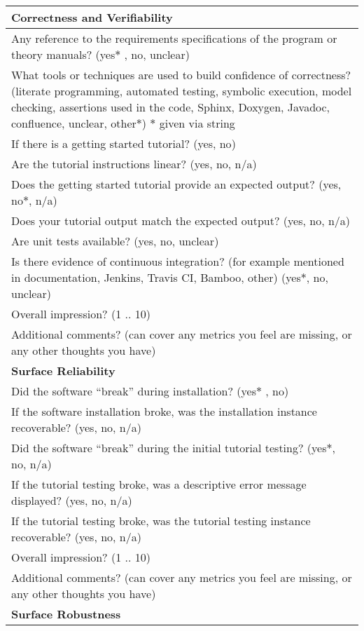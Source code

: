 \begin{table}[H]
\centering
\begin{tabular}{p{14cm}}
\hline
\textbf{Correctness and Verifiability}\\
\hline
Any reference to the requirements specifications of the program or theory manuals? ({yes$\ast$ , no, unclear})\\
What tools or techniques are used to build confidence of correctness? ({literate programming, automated testing, symbolic execution, model checking, assertions used in the code, Sphinx, Doxygen, Javadoc, confluence, unclear, other$\ast$}) $\ast$ given via string\\
If there is a getting started tutorial? ({yes, no})\\
Are the tutorial instructions linear? ({yes, no, n/a})\\
Does the getting started tutorial provide an expected output? ({yes, no$\ast$, n/a})\\
Does your tutorial output match the expected output? ({yes, no, n/a})\\
Are unit tests available?  ({yes, no, unclear})\\
Is there evidence of continuous integration? (for example mentioned in documentation, Jenkins, Travis CI, Bamboo, other) ({yes$\ast$, no, unclear})\\
Overall impression? ({1 .. 10})\\
Additional comments? (can cover any metrics you feel are missing, or any other thoughts you have) \\
\hline	
\textbf{Surface Reliability}\\
\hline
Did the software “break” during installation? ({yes$\ast$ , no})\\
If the software installation broke, was the installation instance recoverable? ({yes, no, n/a})\\
Did the software “break” during the initial tutorial testing? ({yes$\ast$, no, n/a})\\
If the tutorial testing broke, was a descriptive error message displayed? ({yes, no, n/a})\\
If the tutorial testing broke, was the tutorial testing instance recoverable? ({yes, no, n/a})\\
Overall impression? ({1 .. 10})\\
Additional comments? (can cover any metrics you feel are missing, or any other thoughts you have)\\
\hline
\textbf{Surface Robustness}\\

\end{tabular}
\end{table}
